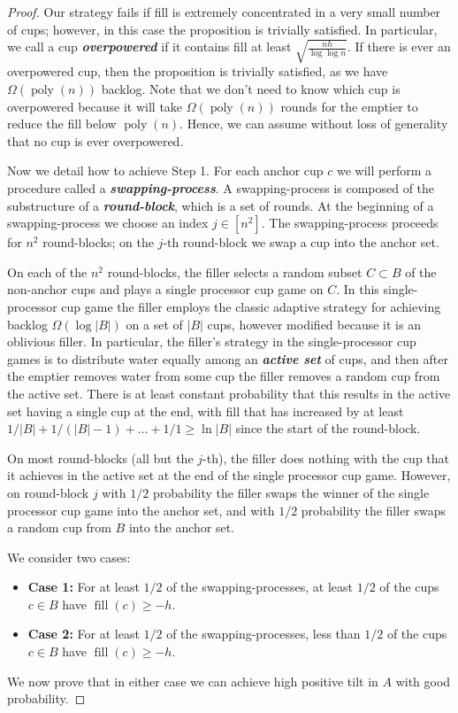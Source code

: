 \documentclass[twocolumn]{article}[10pt]
\newcommand{\defn}[1]{{\textit{\textbf{\boldmath #1}}}\xspace}
\DeclareMathOperator{\poly}{\text{poly}}
\DeclareMathOperator{\fil}{\text{fill}}
\begin{document}
\begin{proof}
Our strategy fails if fill is extremely concentrated in a very small number of
cups; however, in this case the proposition is trivially satisfied. In
particular, we call a cup \defn{overpowered} if it contains fill at least
$\sqrt{\frac{nh}{\log\log n}}$. If there is ever an overpowered cup, then the
proposition is trivially satisfied, as we have $\Omega(\poly(n))$ backlog. Note
that we don't need to know which cup is overpowered because it will take
$\Omega(\poly(n))$ rounds for the emptier to reduce the fill below $\poly(n)$.
Hence, we can assume without loss of generality that no cup is ever
overpowered. 

Now we detail how to achieve Step 1. For each anchor cup $c$ we will perform a
procedure called a \defn{swapping-process}. A swapping-process is composed of
the substructure of a \defn{round-block}, which is a set of rounds.
At the beginning of a swapping-process we choose an index $j \in [n^2]$. The
swapping-process proceeds for $n^2$ round-blocks; on the $j$-th round-block we
swap a cup into the anchor set.

On each of the $n^2$ round-blocks, the filler selects a random subset $C\subset
B$ of the non-anchor cups and plays a single processor cup game on $C$. In this
single-processor cup game the filler employs the classic adaptive strategy for
achieving backlog $\Omega(\log |B|)$ on a set of $|B|$ cups, however modified
because it is an oblivious filler. In particular, the filler's strategy in the
single-processor cup games is to distribute water equally among an \defn{active
set} of cups, and then after the emptier removes water from some cup the filler
removes a random cup from the active set. There is at least constant
probability that this results in the active set having a single cup at the end,
with fill that has increased by at least $1/|B| + 1/(|B|-1) + \ldots + 1/1 \ge
\ln |B|$ since the start of the round-block.

On most round-blocks (all but the $j$-th), the filler does nothing with the cup
that it achieves in the active set at the end of the single processor cup game.
However, on round-block $j$ with $1/2$ probability the filler swaps the winner
of the single processor cup game into the anchor set, and with $1/2$
probability the filler swaps a random cup from $B$ into the anchor set.

We consider two cases:
\begin{itemize}
  \item \textbf{Case 1:} For at least $1/2$ of the swapping-processes, at
    least $1/2$ of the cups $c \in B$ have $\fil(c) \ge -h$.
  \item \textbf{Case 2:} For at least $1/2$ of the swapping-processes, less
    than $1/2$ of the cups $c \in B$ have $\fil(c) \ge -h$.
\end{itemize}
We now prove that in either case we can achieve high positive tilt in $A$ with
good probability.


\end{proof}
\end{document}
